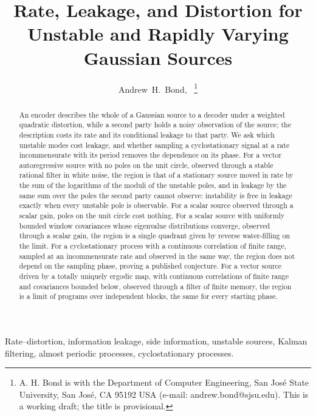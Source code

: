 \documentclass[11pt,onecolumn]{IEEEtran}
\begin{document}
\title{Rate, Leakage, and Distortion for Unstable and Rapidly Varying Gaussian Sources}

\author{Andrew~H.~Bond,~%
\thanks{A. H. Bond is with the Department of Computer Engineering, San Jos\'e
State University, San Jos\'e, CA 95192 USA (e-mail: andrew.bond@sjsu.edu).
This is a working draft; the title is provisional.}}


\maketitle

\begin{abstract}
An encoder describes the whole of a Gaussian source to a decoder under a
weighted quadratic distortion, while a second party holds a noisy
observation of the source; the description costs its rate and its
conditional leakage to that party. We ask which unstable modes cost
leakage, and whether sampling a cyclostationary signal at a rate
incommensurate with its period removes the dependence on its phase. For
a vector autoregressive source with no poles on the unit
circle, observed through a stable rational filter in white noise, the
region is that of a stationary source moved in rate by the sum of the
logarithms of the moduli of the unstable poles, and in leakage by the
same sum over the poles the second party cannot observe: instability is
free in leakage exactly when every unstable pole is observable. For a scalar source
observed through a scalar gain, poles on the unit circle cost nothing.
For a scalar source with uniformly bounded window covariances whose
eigenvalue distributions converge, observed through a scalar gain, the
region is a single quadrant given by reverse
water-filling on the limit. For a cyclostationary process with a
continuous correlation of finite range, sampled at an incommensurate
rate and observed in the same way, the region does not depend on the
sampling phase, proving a published conjecture. For a vector source driven by a
totally uniquely ergodic map, with continuous correlations of finite
range and covariances bounded below, observed through a filter of
finite memory, the region is a limit of programs over independent
blocks, the same for every starting phase.
\end{abstract}

\begin{IEEEkeywords}
Rate--distortion, information leakage, side information, unstable
sources, Kalman filtering, almost periodic processes, cyclostationary
processes.
\end{IEEEkeywords}
\end{document}
